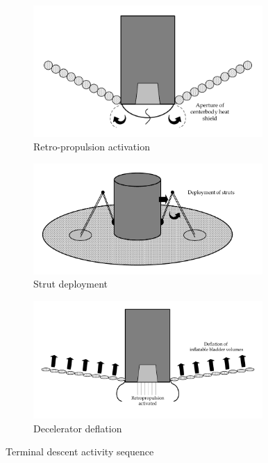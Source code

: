 \begin{figure}[ht]
	\centering
	\begin{subfigure}[b]{0.44\textwidth}
		\includegraphics[width=0.96\textwidth]{./Figure/CrewModule/TDa.pdf}
		\caption{Retro-propulsion activation}
		\label{fig:retroprop}
	\end{subfigure}
		\begin{subfigure}[b]{0.55\textwidth}
		\centering
			\includegraphics[width=0.96\textwidth]{./Figure/CrewModule/TDc.pdf}
			\caption{Strut deployment}
			\label{fig:strut}
		\end{subfigure}
	\begin{subfigure}[b]{0.54\textwidth}
		\includegraphics[width=0.96\textwidth]{./Figure/CrewModule/TDb.pdf}
		\vspace{-4.5mm}
		\caption{Decelerator deflation}
		\label{fig:deflation}
	\end{subfigure}
		\caption{Terminal descent activity sequence}
	\label{fig:tdseq}
\end{figure}


